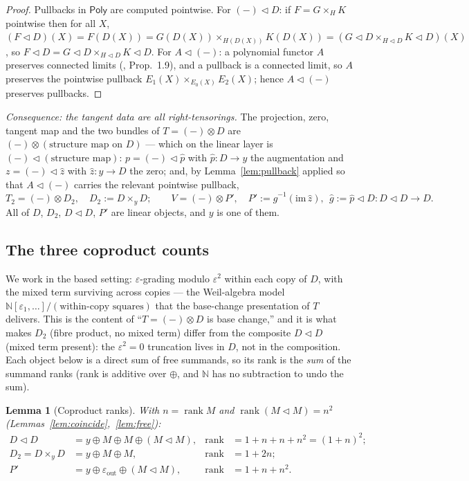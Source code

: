 \documentclass[11pt]{article}
\newtheorem{lemma}[theorem]{Lemma}
\theoremstyle{definition}
\newcommand{\Poly}{\mathsf{Poly}}
\newcommand{\N}{\mathbb{N}}
\newcommand{\rank}{\operatorname{rank}}
\begin{document}
\begin{proof}
Pullbacks in $\Poly$ are computed pointwise. For $(-)\lhd D$: if $F=G\times_H K$ pointwise then for
all $X$, $(F\lhd D)(X)=F(D(X))=G(D(X))\times_{H(D(X))}K(D(X))=(G\lhd D\times_{H\lhd D}K\lhd D)(X)$,
so $F\lhd D=G\lhd D\times_{H\lhd D}K\lhd D$. For $A\lhd(-)$: a polynomial functor $A$ preserves
connected limits (\cite{GambinoKock2013}, Prop.~1.9), and a pullback is a connected limit, so $A$
preserves the pointwise pullback $E_1(X)\times_{E_0(X)}E_2(X)$; hence $A\lhd(-)$ preserves
pullbacks.
\end{proof}

\emph{Consequence: the tangent data are all right-tensorings.} The projection, zero, tangent
map and the two bundles of $T=(-)\otimes D$ are $(-)\otimes(\text{structure map on }D)$ --- which on
the linear layer is $(-)\lhd(\text{structure map})$:
$p=(-)\lhd\hat p$ with $\hat p\colon D\to y$ the augmentation and $z=(-)\lhd\hat z$ with $\hat
z\colon y\to D$ the zero; and, by Lemma~\ref{lem:pullback} applied so that $A\lhd(-)$ carries the
relevant pointwise pullback,
\[
  T_2=(-)\otimes D_2,\quad D_2:=D\times_y D;\qquad
  V=(-)\otimes P',\quad P':=\hat g^{-1}(\mathrm{im}\,\hat z),\ \ \hat g:=\hat p\lhd D\colon D\lhd D\to D.
\]
All of $D$, $D_2$, $D\lhd D$, $P'$ are linear objects, and $y$ is one of them.

\subsection{The three coproduct counts}

We work in the based setting: $\varepsilon$-grading modulo $\varepsilon^2$ within each copy of $D$,
with the mixed term surviving across copies --- the Weil-algebra model
$\N[\varepsilon_1,\dots]/(\text{within-copy squares})$ that the base-change presentation of $T$
\cite{MacBethTangent} delivers. This is the content of ``$T=(-)\otimes D$ is base change,'' and it is
what makes $D_2$ (fibre product, no mixed term) differ from the composite $D\lhd D$ (mixed term
present): the $\varepsilon^2=0$ truncation lives in $D$, not in the composition. Each object below is
a direct sum of free summands, so its rank is the \emph{sum} of the summand ranks (rank is additive
over $\oplus$, and $\N$ has no subtraction to undo the sum).

\begin{lemma}[Coproduct ranks]\label{lem:counts}
With $n=\rank M$ and $\rank(M\lhd M)=n^2$ (Lemmas~\ref{lem:coincide},~\ref{lem:free}):
\[
\begin{aligned}
D\lhd D &= y\oplus M\oplus M\oplus(M\lhd M), &\rank &= 1+n+n+n^2=(1+n)^2;\\
D_2=D\times_y D &= y\oplus M\oplus M, &\rank &= 1+2n;\\
P' &= y\oplus \varepsilon_{\mathrm{out}}\oplus(M\lhd M), &\rank &= 1+n+n^2.
\end{aligned}
\]
\end{lemma}
\end{document}
